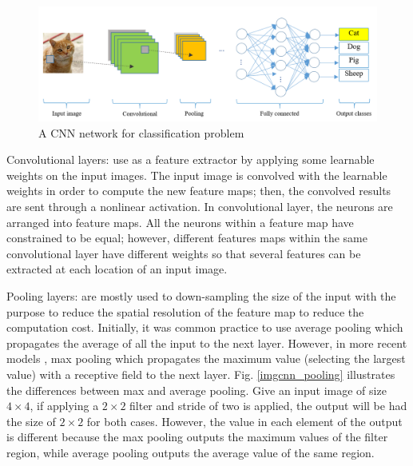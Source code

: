 \documentclass[review]{elsarticle}
\begin{document}
\begin{figure}[!h]
	\centering
	\includegraphics[scale=.5]{images/cnn_network}
	\caption{A CNN network for classification problem}
	\label{imgcnn_network}
\end{figure}

Convolutional layers: use as a feature extractor by applying some learnable weights on the input images. The input image is convolved with the learnable weights in order to compute the new feature maps; then, the convolved results are sent through a nonlinear activation. In convolutional layer, the neurons are arranged into feature maps. All the neurons within a feature map have constrained to be equal; however, different features maps within the same convolutional layer have different weights so that several features can be extracted at each location of an input image. 

Pooling layers: are mostly used to down-sampling the size of the input with the purpose to reduce the spatial resolution of the feature map to reduce the computation cost. Initially, it was common practice to use average pooling which propagates the average of all the input to the next layer. However, in more recent models \cite{krizhevsky2012imagenet, ciregan2012multi, li2015convolutional}, max pooling which propagates the maximum value (selecting the largest value) with a receptive field to the next layer. Fig. \ref{imgcnn_pooling} illustrates the differences between max and average pooling. Give an input image of size $4 \times 4$, if applying a $2 \times 2$ filter and stride of two is applied, the output will be had the size of $2 \times 2$ for both cases. However, the value in each element of the output is different because the max pooling outputs the maximum values of the filter region, while average pooling outputs the average value of the same region.
\end{document}
